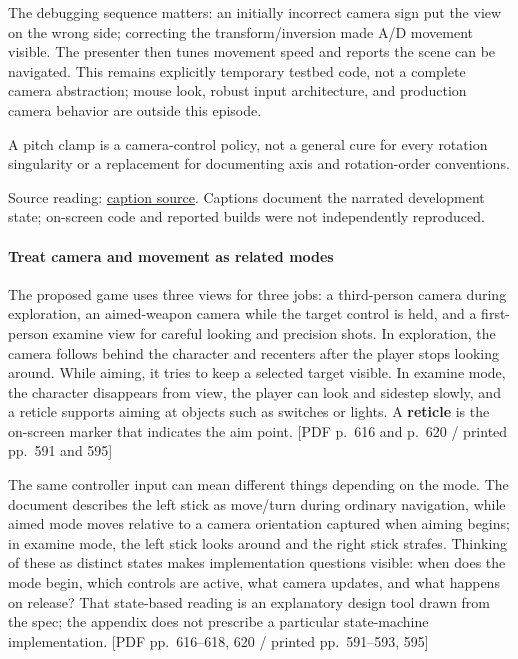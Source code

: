 The debugging sequence matters: an initially incorrect camera sign put the view on the wrong side; correcting the transform/inversion made A/D movement visible. The presenter then tunes movement speed and reports the scene can be navigated. This remains explicitly temporary testbed code, not a complete camera abstraction; mouse look, robust input architecture, and production camera behavior are outside this episode.

A pitch clamp is a camera-control policy, not a general cure for every rotation singularity or a replacement for documenting axis and rotation-order conventions.

Source reading: \href{https://www.youtube.com/watch?v=s9xSwQvbG2w}{caption source}. Captions document the narrated development state; on-screen code and reported builds were not independently reproduced.

\paragraph{Treat camera and movement as related modes}\label{06-engine-ii-ch026-treat-camera-and-movement-as-related-modes}

\hypertarget{06-engine-ii-ch026-treat-camera-and-movement-as-related-modes}{}

The proposed game uses three views for three jobs: a third-person camera during exploration, an aimed-weapon camera while the target control is held, and a first-person examine view for careful looking and precision shots. In exploration, the camera follows behind the character and recenters after the player stops looking around. While aiming, it tries to keep a selected target visible. In examine mode, the character disappears from view, the player can look and sidestep slowly, and a reticle supports aiming at objects such as switches or lights. A \textbf{reticle} is the on-screen marker that indicates the aim point. {[}PDF p.~616 and p.~620 / printed pp.~591 and 595{]}

The same controller input can mean different things depending on the mode. The document describes the left stick as move/turn during ordinary navigation, while aimed mode moves relative to a camera orientation captured when aiming begins; in examine mode, the left stick looks around and the right stick strafes. Thinking of these as distinct states makes implementation questions visible: when does the mode begin, which controls are active, what camera updates, and what happens on release? That state-based reading is an explanatory design tool drawn from the spec; the appendix does not prescribe a particular state-machine implementation. {[}PDF pp.~616--618, 620 / printed pp.~591--593, 595{]}

